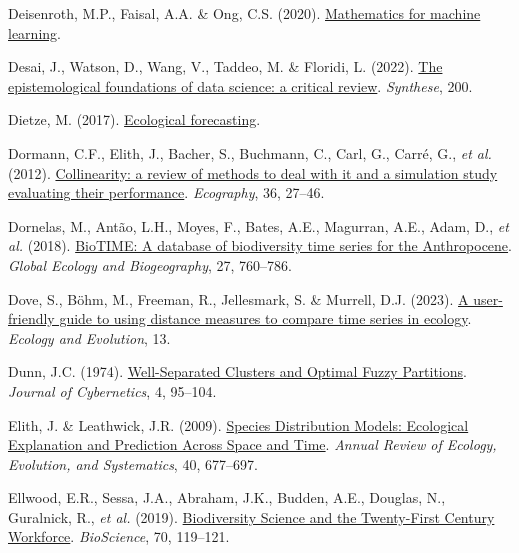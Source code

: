\documentclass[
  letterpaper,
]{scrbook}
\newlength{\cslhangindent}
\newenvironment{CSLReferences}[2] %
 {\begin{list}{}{%
  \setlength{\itemindent}{0pt}
  \setlength{\leftmargin}{0pt}
  \setlength{\parsep}{0pt}
  \ifodd #1
   \setlength{\leftmargin}{\cslhangindent}
   \setlength{\itemindent}{-1\cslhangindent}
  \fi
  \setlength{\itemsep}{#2\baselineskip}}}
 {\end{list}}
\begin{document}
\begin{CSLReferences}{1}{0}
Deisenroth, M.P., Faisal, A.A. \& Ong, C.S. (2020).
\href{https://doi.org/10.1017/9781108679930}{Mathematics for machine
learning}.

Desai, J., Watson, D., Wang, V., Taddeo, M. \& Floridi, L. (2022).
\href{https://doi.org/10.1007/s11229-022-03933-2}{The epistemological
foundations of data science: a critical review}. \emph{Synthese}, 200.

Dietze, M. (2017).
\href{https://doi.org/10.1515/9781400885459}{Ecological forecasting}.

Dormann, C.F., Elith, J., Bacher, S., Buchmann, C., Carl, G., Carré, G.,
\emph{et al.} (2012).
\href{https://doi.org/10.1111/j.1600-0587.2012.07348.x}{Collinearity: a
review of methods to deal with it and a simulation study evaluating
their performance}. \emph{Ecography}, 36, 27--46.

Dornelas, M., Antão, L.H., Moyes, F., Bates, A.E., Magurran, A.E., Adam,
D., \emph{et al.} (2018).
\href{https://doi.org/10.1111/geb.12729}{BioTIME: A database of
biodiversity time series for the Anthropocene}. \emph{Global Ecology and
Biogeography}, 27, 760--786.

Dove, S., Böhm, M., Freeman, R., Jellesmark, S. \& Murrell, D.J. (2023).
\href{https://doi.org/10.1002/ece3.10520}{A user{-}friendly guide to
using distance measures to compare time series in ecology}.
\emph{Ecology and Evolution}, 13.

Dunn, J.C. (1974).
\href{https://doi.org/10.1080/01969727408546059}{Well-Separated Clusters
and Optimal Fuzzy Partitions}. \emph{Journal of Cybernetics}, 4,
95--104.

Elith, J. \& Leathwick, J.R. (2009).
\href{https://doi.org/10.1146/annurev.ecolsys.110308.120159}{Species
Distribution Models: Ecological Explanation and Prediction Across Space
and Time}. \emph{Annual Review of Ecology, Evolution, and Systematics},
40, 677--697.

Ellwood, E.R., Sessa, J.A., Abraham, J.K., Budden, A.E., Douglas, N.,
Guralnick, R., \emph{et al.} (2019).
\href{https://doi.org/10.1093/biosci/biz147}{Biodiversity Science and
the Twenty-First Century Workforce}. \emph{BioScience}, 70, 119--121.


\end{CSLReferences}
\end{document}
